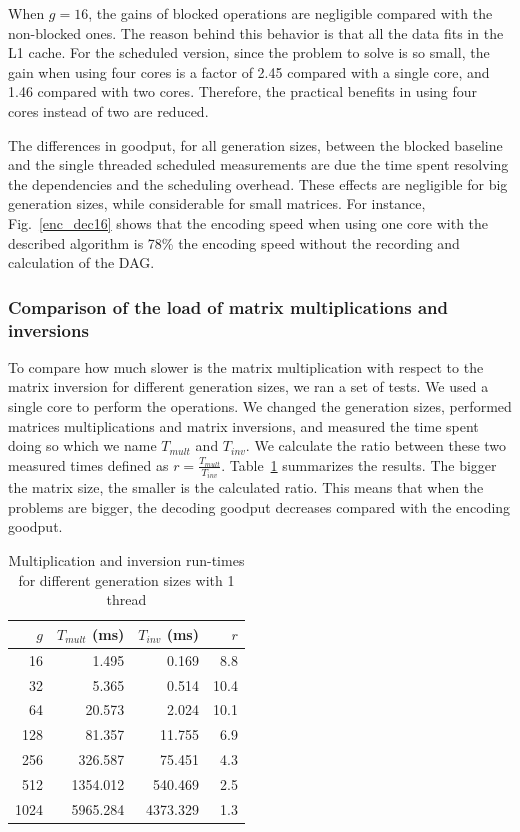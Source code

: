 When $g = 16$, the gains of blocked operations are negligible compared with
the non-blocked ones. The reason behind this behavior is that all the data
fits in the L1 cache. For the scheduled version, since the problem to solve
is so small, the gain when using four cores is a factor of 2.45 compared
with a single core, and 1.46 compared with two cores. Therefore, the
practical benefits in using four cores instead of two are reduced.

The differences in goodput, for all generation sizes, between the
blocked baseline and the single threaded scheduled measurements are due the
time spent resolving the dependencies and the scheduling overhead. These
effects are negligible for big generation sizes, while considerable for
small matrices. For instance, Fig.~\ref{enc_dec16} shows that the encoding
speed when using one core with the described algorithm is 78\% the encoding
speed without the recording and calculation of the \ac{DAG}.

\subsubsection{Comparison of the load of matrix multiplications and inversions}

To compare how much slower is the matrix multiplication with respect to the
matrix inversion for different generation sizes, we ran a set of tests. We used
a single core to perform the operations. We changed the generation sizes,
performed matrices multiplications and matrix inversions, and measured the time
spent doing so which we name $T_{mult}$ and $T_{inv}$. We calculate the ratio
between these two measured times defined as $r = \frac{T_{mult}}{T_{inv}}$.
Table~\ref{runtimes} summarizes the results. The bigger the matrix size, the
smaller is the calculated ratio. This means that when the problems are bigger,
the decoding goodput decreases compared with the encoding goodput.

\begin{table}[H]
\center
\caption{Multiplication and inversion run-times for different generation sizes with 1 thread}
\begin{tabular}{|r|r|r|r|}

\hline
$g$ & $T_{mult}$ (ms) & $T_{inv}$ (ms) &$r$ \\
\hline
\hline

	16   & 1.495     & 0.169    & 8.8 \\
\hline
	32   & 5.365     & 0.514    & 10.4 \\
\hline
	64   & 20.573    & 2.024    & 10.1 \\
\hline
	128  & 81.357    & 11.755   & 6.9 \\
\hline
	256  & 326.587   & 75.451  & 4.3 \\
\hline
	512  & 1354.012  & 540.469  & 2.5 \\
\hline
	1024 & 5965.284  & 4373.329 & 1.3 \\
\hline
\end{tabular}
\vspace{0.2cm}
\label{runtimes}
\end{table}
